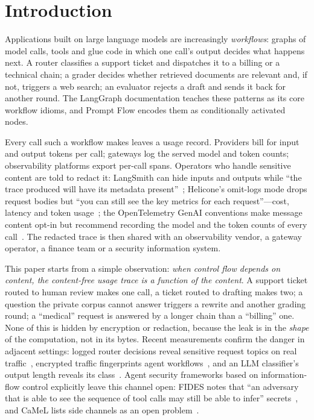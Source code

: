 \section{Introduction}\label{sec:intro}

Applications built on large language models are increasingly \emph{workflows}: graphs of model calls, tools and glue code in which one call's output decides what happens next. A router classifies a support ticket and dispatches it to a billing or a technical chain; a grader decides whether retrieved documents are relevant and, if not, triggers a web search; an evaluator rejects a draft and sends it back for another round. The LangGraph documentation teaches these patterns as its core workflow idioms, and Prompt Flow encodes them as conditionally activated nodes.

Every call such a workflow makes leaves a usage record. Providers bill for input and output tokens per call; gateways log the served model and token counts; observability platforms export per-call spans. Operators who handle sensitive content are told to redact it: LangSmith can hide inputs and outputs while ``the trace produced will have its metadata present''~\cite{langsmith2026mask}; Helicone's omit-logs mode drops request bodies but ``you can still see the key metrics for each request''---cost, latency and token usage~\cite{helicone2026omit}; the OpenTelemetry GenAI conventions make message content opt-in but recommend recording the model and the token counts of every call~\cite{otel2026genai}. The redacted trace is then shared with an observability vendor, a gateway operator, a finance team or a security information system.

This paper starts from a simple observation: \emph{when control flow depends on content, the content-free usage trace is a function of the content}. A support ticket routed to human review makes one call, a ticket routed to drafting makes two; a question the private corpus cannot answer triggers a rewrite and another grading round; a ``medical'' request is answered by a longer chain than a ``billing'' one. None of this is hidden by encryption or redaction, because the leak is in the \emph{shape} of the computation, not in its bytes. Recent measurements confirm the danger in adjacent settings: logged router decisions reveal sensitive request topics on real traffic~\cite{chen2026routing}, encrypted traffic fingerprints agent workflows~\cite{zhang2025agentprint,pouryousef2026benchmark}, and an LLM classifier's output length reveals its class~\cite{zhang2024timewilltell}. Agent security frameworks based on information-flow control explicitly leave this channel open: FIDES notes that ``an adversary that is able to see the sequence of tool calls may still be able to infer'' secrets~\cite{costa2025fides}, and CaMeL lists side channels as an open problem~\cite{debenedetti2025camel}.

